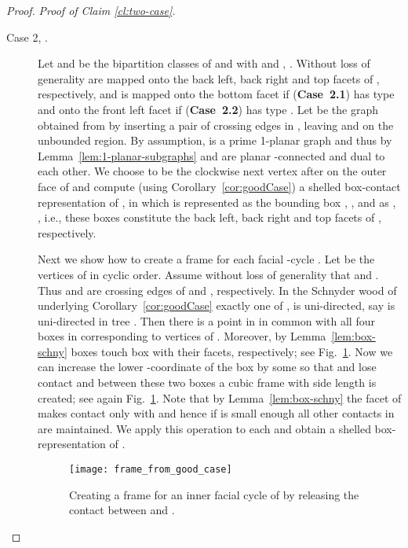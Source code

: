 \documentclass{article}
\newenvironment{claimproof}[1]{\noindent \textit{Proof of Claim #1.}}
{
\hfill \medskip
}
\begin{document}
\begin{proof}
\begin{claimproof}{\ref{cl:two-case}}
\begin{description}
    \item[Case 2, .]
     Let  and  be the bipartition classes of  and  with  and , .
     Without loss of generality  are mapped onto the back left, back right and top facets of , respectively, and  is mapped onto the bottom facet if (\textbf{Case~2.1})  has type  and onto the front left facet if (\textbf{Case~2.2})  has type .
     Let  be the graph obtained from  by inserting a pair of crossing edges in , leaving  and  on the unbounded region.
     By assumption,  is a prime 1-planar graph and thus by Lemma~\ref{lem:1-planar-subgraphs}  and  are planar -connected and dual to each other.
     We choose  to be the clockwise next vertex after  on the outer face of  and compute (using Corollary~\ref{cor:goodCase}) a shelled box-contact representation  of , in which  is represented as the bounding box , , and  as , , i.e., these boxes constitute the back left, back right and top facets of , respectively.

     Next we show how to create a frame for each facial -cycle .
     Let  be the vertices of  in cyclic order.
     Assume without loss of generality that  and .
     Thus  and  are crossing edges of  and , respectively.
     In the Schnyder wood of  underlying Corollary~\ref{cor:goodCase} exactly one of ,  is uni-directed, say  is uni-directed in tree .
     Then there is a point in  in common with all four boxes in  corresponding to vertices of .
     Moreover, by Lemma~\ref{lem:box-schny} boxes  touch box  with their  facets, respectively; see Fig.~\ref{fig:frame_from_good_case}.
     Now we can increase the lower -coordinate of the box  by some  so that  and  lose contact and between these two boxes a cubic frame  with side length  is created; see again Fig.~\ref{fig:frame_from_good_case}.
     Note that by Lemma~\ref{lem:box-schny} the  facet of  makes contact only with  and hence if  is small enough all other contacts in  are maintained.
     We apply this operation to each  and obtain a shelled box-representation  of .

     \begin{figure}[htb]
\centering
      \texttt{[image: frame\_from\_good\_case]}
      \caption{Creating a frame  for an inner facial cycle  of  by releasing the contact between  and .}
      \label{fig:frame_from_good_case}
     \end{figure}


\end{description}
\end{claimproof}
\end{proof}
\end{document}

